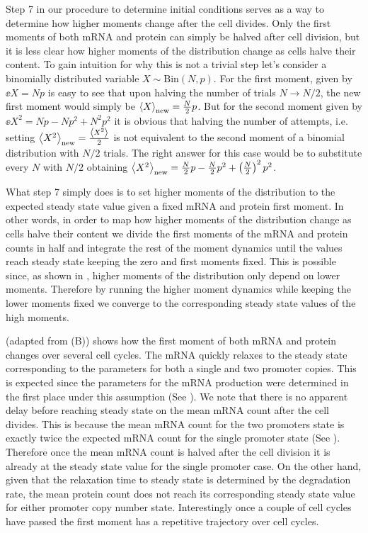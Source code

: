 Step 7 in our procedure to determine initial conditions serves as a way to
determine how higher moments change after the cell divides. Only the first
moments of both mRNA and protein can simply be halved after cell division, but
it is less clear how higher moments of the distribution change as cells halve
their content. To gain intuition for why this is not a trivial step let's
consider a binomially distributed variable $X \sim \text{Bin}(N, p)$. For the
first moment, given by $\ee{X} = Np$ is easy to see that upon halving the number
of trials $N \rightarrow N/2$, the new first moment would simply be
$\left\langle X \right\rangle_{\text{new}} = {N \over 2} p$. But for the second moment given by
$\ee{X^2} = Np - Np^2 + N^2p^2$ it is obvious that halving the number of
attempts, i.e. setting $\left\langle X^2 \right\rangle_{\text{new}} = {\left\langle X^2 \right\rangle \over 2}$ is not
equivalent to the second moment of a binomial distribution with $N/2$ trials.
The right answer for this case would be to substitute every $N$ with $N/2$
obtaining $\left\langle X^2 \right\rangle_{\text{new}} = {N \over 2}p - {N \over 2}p^2 + \left({N
\over 2}\right)^2p^2$.

What step 7 simply does is to set higher moments of the distribution to the
expected steady state value given a fixed mRNA and protein first moment. In
other words, in order to map how higher moments of the distribution change as
cells halve their content we divide the first moments of the mRNA and protein
counts in half and integrate the rest of the moment dynamics until the values
reach steady state keeping the zero and first moments fixed. This is possible
since, as shown in , higher moments of the distribution only
depend on lower moments. Therefore by running the higher moment dynamics while
keeping the lower moments fixed we converge to the corresponding steady state
values of the high moments.

 (adapted from (B)) shows how
the first moment of both mRNA and protein changes over several cell cycles. The
mRNA quickly relaxes to the steady state corresponding to the parameters for
both a single and two promoter copies. This is expected since the parameters for
the mRNA production were determined in the first place under this assumption
(See ). We note that there is no apparent delay before
reaching steady state on the mean mRNA count after the cell divides. This is
because the mean mRNA count for the two promoters state is exactly twice the
expected mRNA count for the single promoter state (See ).
Therefore once the mean mRNA count is halved after the cell division it is
already at the steady state value for the single promoter case. On the other
hand, given that the relaxation time to steady state is determined by the
degradation rate, the mean protein count does not reach its corresponding steady
state value for either promoter copy number state. Interestingly once a couple
of cell cycles have passed the first moment has a repetitive trajectory over
cell cycles.

